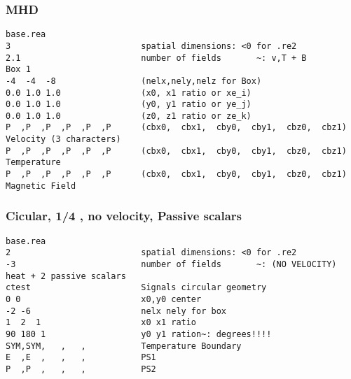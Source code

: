 \subsubsection{ MHD}
\begin{verbatim}base.rea
3                          spatial dimensions: <0 for .re2
2.1                        number of fields       ~: v,T + B
Box 1
-4  -4  -8                 (nelx,nely,nelz for Box)
0.0 1.0 1.0                (x0, x1 ratio or xe_i)
0.0 1.0 1.0                (y0, y1 ratio or ye_j)
0.0 1.0 1.0                (z0, z1 ratio or ze_k)
P  ,P  ,P  ,P  ,P  ,P      (cbx0,  cbx1,  cby0,  cby1,  cbz0,  cbz1)  Velocity (3 characters)
P  ,P  ,P  ,P  ,P  ,P      (cbx0,  cbx1,  cby0,  cby1,  cbz0,  cbz1)  Temperature
P  ,P  ,P  ,P  ,P  ,P      (cbx0,  cbx1,  cby0,  cby1,  cbz0,  cbz1)  Magnetic Field
\end{verbatim}
\subsubsection{ Cicular, 1/4 , no velocity, Passive scalars}
\begin{verbatim}base.rea
2                          spatial dimensions: <0 for .re2
-3                         number of fields       ~: (NO VELOCITY) heat + 2 passive scalars
ctest                      Signals circular geometry
0 0                        x0,y0 center
-2 -6                      nelx nely for box
1  2  1                    x0 x1 ratio
90 180 1                   y0 y1 ration~: degrees!!!!
SYM,SYM,   ,   ,           Temperature Boundary
E  ,E  ,   ,   ,           PS1
P  ,P  ,   ,   ,           PS2
\end{verbatim}
